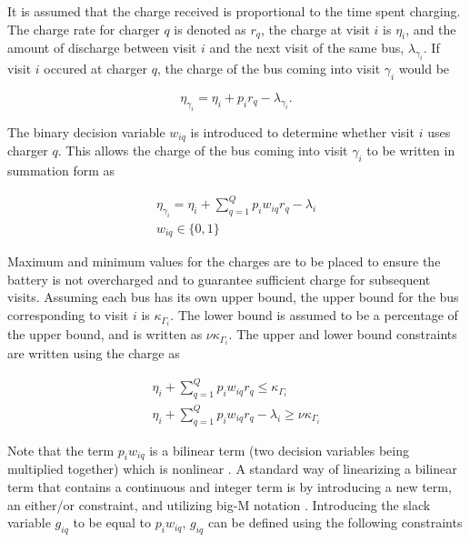 \documentclass[letterpaper, 10pt, conference]{IEEEtran}
\begin{document}
It is assumed that the charge received is proportional to the time spent charging. The charge rate for charger $q$ is
denoted as $r_q$, the charge at visit $i$ is $\eta_i$, and the amount of discharge between visit $i$ and the next visit of
the same bus, $\lambda_{\gamma_i}$. If visit $i$ occured at charger $q$, the charge of the bus coming into visit $\gamma_i$ would be

\begin{equation}
	\eta_{\gamma_i} = \eta_i + p_i r_q - \lambda_{\gamma_i}.
\end{equation}

The binary decision variable $w_{iq}$ is introduced to determine whether visit $i$ uses charger $q$. This allows the
charge of the bus coming into visit $\gamma_i$ to be written in summation form as

\begin{subequations}
\begin{align}
    \eta_{\gamma_i} = \eta_i + \sum_{q=1}^Q p_i w_{iq} r_q - \lambda_i \\
    w_{iq} \in \{0,1\}
\end{align}
\end{subequations}

Maximum and minimum values for the charges are to be placed to ensure the battery is not overcharged and to guarantee
sufficient charge for subsequent visits. Assuming each bus has its own upper bound, the upper bound for the bus
corresponding to visit $i$ is $\kappa_{\Gamma_i}$. The lower bound is assumed to be a percentage of the upper bound, and is
written as $\nu \kappa_{\Gamma_i}$. The upper and lower bound constraints are written using the charge as

\begin{subequations}
\begin{align}
    \eta_i + \sum_{q=1}^Q p_i w_{iq} r_q \leq \kappa_{\Gamma_i}                 \\
    \eta_i + \sum_{q=1}^Q p_i w_{iq} r_q - \lambda_i \geq \nu \kappa_{\Gamma_i}
\end{align}
\end{subequations}

Note that the term $p_i w_{iq}$ is a bilinear term (two decision variables being multiplied together) which is nonlinear
\cite{Rodriguez2013}. A standard way of linearizing a bilinear term that contains a continuous and integer term is by
introducing a new term, an either/or constraint, and utilizing big-M notation \cite{Chen2010,Rodriguez2013}. Introducing
the slack variable $g_{iq}$ to be equal to $p_i w_{iq}$, $g_{iq}$ can be defined using the following constraints
\end{document}

